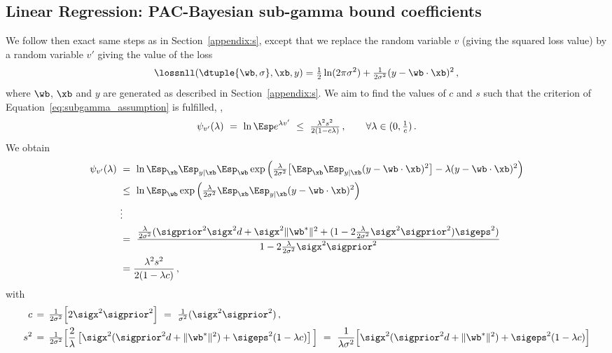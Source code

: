 \documentclass{article}
\theoremstyle{definition}
\theoremstyle{plain}
\begin{document}
\subsection{Linear Regression: PAC-Bayesian sub-gamma bound coefficients}
\label{appendix:linregsubgamma}

We follow then exact same steps as in Section~\ref{appendix:s}, except that we replace the random variable $v$ (giving the squared loss value) by a random variable $v'$ giving the value of the loss
\begin{equation*}%
\lossnll(\dtuple{\wb, \sigma},\xb,y) 
%
= \tfrac12 \ln(2\pi\sigma^2) + \tfrac1{2\sigma^2} (y - \wb\cdot\xb)^2\,,
\end{equation*}
where $\wb$, $\xb$ and $y$ are generated as described in Section~\ref{appendix:s}. We aim to find the values of $c$ and $s$ such that the criterion of Equation~\eqref{eq:subgamma_assumption} is fulfilled, \ie,
\begin{equation*}
\psi_{v'}(\lambda)
\ = \ \ln \Esp e^{\lambda v'}
%
\ \leq \ {\tfrac{\lambda^2 s^2}{2(1-c\lambda)}}\,,  \qquad \forall \lambda  \in (0, \tfrac1c)\,.
\end{equation*}
We obtain
	\begin{align} 
\psi_{v'}(\lambda) 
\ &=\ \nonumber
\ln \Esp_\xb \Esp_{y|\xb} \Esp_\wb \exp\Big( \tfrac{\lambda}{2\sigma^2} \big[ \Esp_\xb \Esp_{y|\xb} (y-\wb\cdot \xb )^2  \big] - \lambda(y-\wb\cdot \xb )^2  \Big)\\
\ &\leq\ \nonumber
\ln \Esp_\wb \exp\Big( \tfrac{\lambda}{2\sigma^2}  \Esp_\xb \Esp_{y|\xb} (y-\wb\cdot \xb )^2\Big) \\
&\vdots\\
&=\ \nonumber
\frac{\tfrac{\lambda}{2\sigma^2}(\sigprior^2\sigx^2 d+\sigx^2 \|\wb^*\|^2+ (1-2\tfrac{\lambda}{2\sigma^2}\sigx^2\sigprior^2)\sigeps^2)}{1-2\tfrac{\lambda}{2\sigma^2}\sigx^2\sigprior^2}\\
&=\nonumber
\frac{\lambda^2 s^2}{2(1-\lambda c)}\,,
\end{align}
with 
\begin{align*}
c &\,=\, \tfrac{1}{2\sigma^2}\Big[  2\sigx^2\sigprior^2\Big]
\ =\  \tfrac{1}{\sigma^2} (\sigx^2\sigprior^2)\,,\\
s^2 &\,=\,  \tfrac{1}{2\sigma^2} \Big[\dfrac2\lambda\left[\sigx^2(\sigprior^2d+ \|\wb^*\|^2)+ \sigeps^2(1-\lambda c)\right]\Big] \ = \ 
 \dfrac1{\lambda\sigma^2} \Big[\sigx^2(\sigprior^2d+ \|\wb^*\|^2)+ \sigeps^2(1-\lambda c) \Big] 
\end{align*}
%
%
%
%
%
%
%
%
%
%
%
%
%
%
%
%
%
%
%
%
\end{document}
